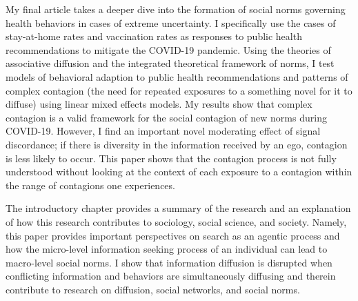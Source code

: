 My final article takes a deeper dive into the formation of social norms
governing health behaviors in cases of extreme uncertainty. I specifically use
the cases of stay-at-home rates and vaccination rates as responses to public
health recommendations to mitigate the COVID-19 pandemic. Using the theories of
associative diffusion and the integrated theoretical framework of norms, I test
models of behavioral adaption to public health recommendations and patterns of
complex contagion (the need for repeated exposures to a something novel for it
to diffuse) using linear mixed effects models. My results show that complex
contagion is a valid framework for the social contagion of new norms during
COVID-19. However, I find an important novel moderating effect of signal
discordance; if there is diversity in the information received by an ego,
contagion is less likely to occur. This paper shows that the contagion process
is not fully understood without looking at the context of each exposure to a
contagion within the range of contagions one experiences.

The introductory chapter provides a summary of the research and an explanation
of how this research contributes to sociology, social science, and society.
Namely, this paper provides important perspectives on search as an agentic
process and how the micro-level information seeking process of an individual can
lead to macro-level social norms. I show that information diffusion is disrupted
when conflicting information and behaviors are simultaneously diffusing and
therein contribute to research on diffusion, social networks, and social norms.



